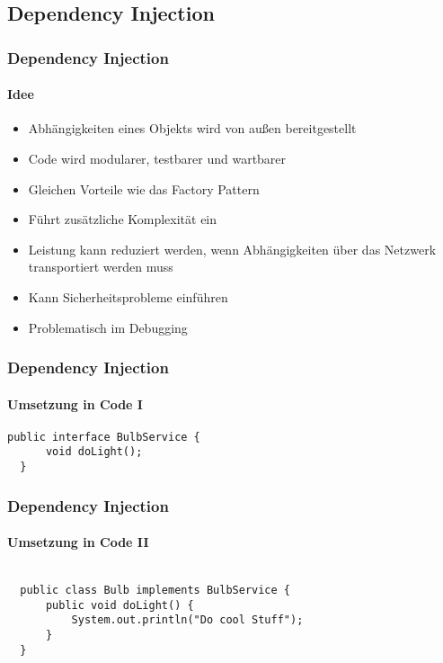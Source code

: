 \subsection{Dependency Injection}
\begin{frame}
  \frametitle{Dependency Injection}
  \framesubtitle{Idee}
  \begin{itemize}
    \item Abhängigkeiten eines Objekts wird von außen bereitgestellt
    \item Code wird modularer, testbarer und wartbarer
    \item Gleichen Vorteile wie das Factory Pattern
    \item Führt zusätzliche Komplexität ein 
    \item Leistung kann reduziert werden, wenn Abhängigkeiten über das Netzwerk transportiert werden muss
    \item Kann Sicherheitsprobleme einführen
    \item Problematisch im Debugging
  \end{itemize}
\end{frame}

\begin{frame}[fragile]
  \frametitle{Dependency Injection}
  \framesubtitle{Umsetzung in Code I}
  \begin{minipage}{\textwidth}
  \begin{lstlisting}[caption={Schnittstelle für die Abhängigkeit},captionpos=b,label={lst:di-interface}]
  public interface BulbService {
      void doLight();
  }
  \end{lstlisting}
  \end{minipage}
\end{frame}

\begin{frame}[fragile]
  \frametitle{Dependency Injection}
  \framesubtitle{Umsetzung in Code II}
  \begin{minipage}{\textwidth}
  \begin{lstlisting}[caption={Schnittstellenimplementierung},captionpos=b,label={lst:di-interface-implementation}]

  public class Bulb implements BulbService {
      public void doLight() {
          System.out.println("Do cool Stuff");
      }
  }
  \end{lstlisting}
  \end{minipage}
\end{frame}

